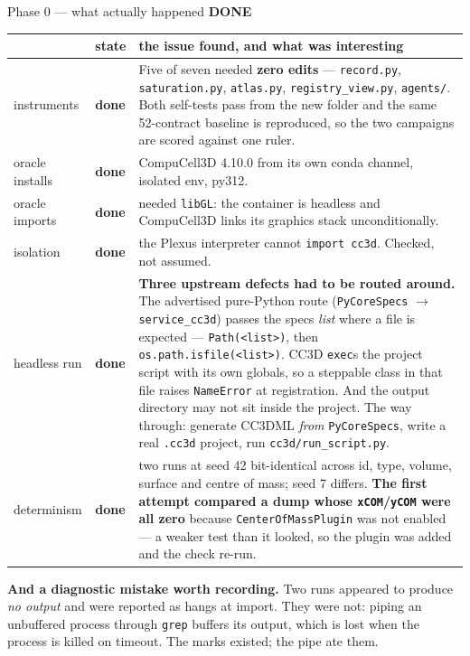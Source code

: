\documentclass[11pt,a4paper]{article}
\newcommand{\code}[1]{\texttt{#1}}
\newcommand{\dn}{\textcolor{good}{\textbf{done}}}
\newcommand{\done}{\textcolor{good}{\textbf{DONE}}}
\begin{document}
\begin{phasebox}{Phase 0 --- what actually happened \hfill \done}
\footnotesize
\begin{tabular}{@{}l l p{8.4cm}@{}}
\toprule
& \textbf{state} & \textbf{the issue found, and what was interesting}\\
\midrule
instruments & \dn & Five of seven needed \textbf{zero edits} --- \code{record.py},
\code{saturation.py}, \code{atlas.py}, \code{registry\_view.py}, \code{agents/}. Both self-tests
pass from the new folder and the same 52-contract baseline is reproduced, so the two campaigns are
scored against one ruler.\\
oracle installs & \dn & CompuCell3D 4.10.0 from its own conda channel, isolated env, py312.\\
oracle imports & \dn & needed \code{libGL}: the container is headless and CompuCell3D links its
graphics stack unconditionally.\\
isolation & \dn & the Plexus interpreter cannot \code{import cc3d}. Checked, not assumed.\\
headless run & \dn & \textbf{Three upstream defects had to be routed around.} The advertised
pure-Python route (\code{PyCoreSpecs} $\to$ \code{service\_cc3d}) passes the specs \emph{list}
where a file is expected --- \code{Path(<list>)}, then \code{os.path.isfile(<list>)}. CC3D
\code{exec}s the project script with its own globals, so a steppable class in that file raises
\code{NameError} at registration. And the output directory may not sit inside the project. The way
through: generate CC3DML \emph{from} \code{PyCoreSpecs}, write a real \code{.cc3d} project, run
\code{cc3d/run\_script.py}.\\
determinism & \dn & two runs at seed 42 bit-identical across id, type, volume, surface and centre
of mass; seed 7 differs. \textbf{The first attempt compared a dump whose \code{xCOM}/\code{yCOM}
were all zero} because \code{CenterOfMassPlugin} was not enabled --- a weaker test than it looked,
so the plugin was added and the check re-run.\\
\bottomrule
\end{tabular}

\textbf{And a diagnostic mistake worth recording.} Two runs appeared to produce \emph{no output}
and were reported as hangs at import. They were not: piping an unbuffered process through
\code{grep} buffers its output, which is lost when the process is killed on timeout. The marks
existed; the pipe ate them.
\end{phasebox}
\end{document}
